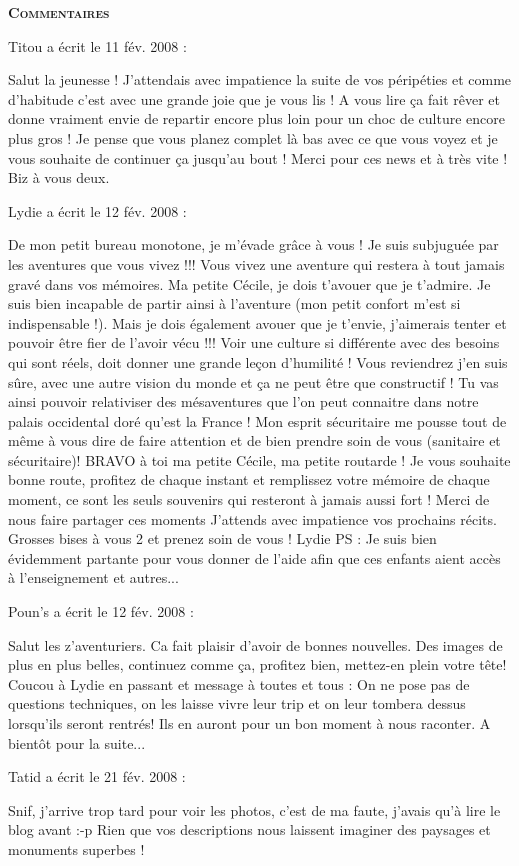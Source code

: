 \bigskip
\textbf{\textsc{Commentaires}}

\medskip
Titou a écrit le 11 fév. 2008 :
\begin{displayquote}
Salut la jeunesse ! J'attendais avec impatience la suite de vos péripéties et comme d'habitude c'est avec une grande joie que je vous lis ! A vous lire ça fait rêver et donne vraiment envie de repartir encore plus loin pour un choc de culture encore plus gros ! Je pense que vous planez complet là bas avec ce que vous voyez et je vous souhaite de continuer ça jusqu'au bout ! Merci pour ces news et à très vite ! Biz à vous deux.
\end{displayquote}

\medskip
Lydie a écrit le 12 fév. 2008 :
\begin{displayquote}
De mon petit bureau monotone, je m'évade grâce à vous !
Je suis subjuguée par les aventures que vous vivez !!!
Vous vivez une aventure qui restera à tout jamais gravé dans vos mémoires.
Ma petite Cécile, je dois t'avouer que je t'admire. Je suis bien incapable de partir ainsi à l'aventure (mon petit confort m'est si indispensable !).
Mais je dois également avouer que je t'envie, j'aimerais tenter et pouvoir être fier de l'avoir vécu !!!
Voir une culture si différente avec des besoins qui sont réels, doit donner une grande leçon d'humilité !
Vous reviendrez j'en suis sûre, avec une autre vision du monde et ça ne peut être que constructif !
Tu vas ainsi pouvoir relativiser des mésaventures que l'on peut connaitre dans notre palais occidental doré qu'est la France !
Mon esprit sécuritaire me pousse tout de même à vous dire de faire attention et de bien prendre soin de vous (sanitaire et sécuritaire)!
BRAVO à toi ma petite Cécile, ma petite routarde !
Je vous souhaite bonne route, profitez de chaque instant et remplissez votre mémoire de chaque moment, ce sont les seuls souvenirs qui resteront à jamais aussi fort !
Merci de nous faire partager ces moments
J'attends avec impatience vos prochains récits.
Grosses bises à vous 2 et prenez soin de vous !
Lydie
PS : Je suis bien évidemment partante pour vous donner de l'aide afin que ces enfants aient accès à l'enseignement et autres...
\end{displayquote}

\medskip
Poun's a écrit le 12 fév. 2008 :
\begin{displayquote}
Salut les z'aventuriers. Ca fait plaisir d'avoir de bonnes nouvelles. Des images de plus en plus belles, continuez comme ça, profitez bien, mettez-en plein votre tête!
Coucou à Lydie en passant et message à toutes et tous :
On ne pose pas de questions techniques, on les laisse vivre leur trip et on leur tombera dessus lorsqu'ils seront rentrés! Ils en auront pour un bon moment à nous raconter.
A bientôt pour la suite...
\end{displayquote}

\medskip
Tatid a écrit le 21 fév. 2008 :
\begin{displayquote}
Snif, j'arrive trop tard pour voir les photos, c'est de ma faute, j'avais qu'à lire le blog avant :-p
Rien que vos descriptions nous laissent imaginer des paysages et monuments superbes !
\end{displayquote}

\vfill

